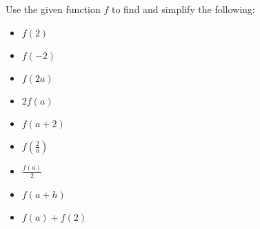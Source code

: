 \begin{enumialphparenastyle}
\begin{multicols}{2}
\begin{ex}
Use the given function $f$ to find and simplify the following:\\
 \begin{multicols}{3}
	\begin{itemize}
		\item  $f(2)$
		\item  $f(-2)$
		\item  $f(2a)$
		\item  $2 f(a)$
		\item $f(a+2)$
		\item  $\displaystyle{f \left( \frac{2}{a} \right)}$
		\item $\displaystyle{\frac{f(a)}{2}}$
		\item  $f(a + h)$
		\item $\displaystyle{f(a) + f(2)}$
	\end{itemize}
\end{multicols}


\end{ex}
\end{multicols}
\end{enumialphparenastyle}
